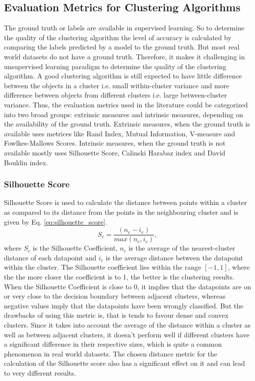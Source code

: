 \subsection{Evaluation Metrics for Clustering Algorithms}
The ground truth or labels are available in supervised learning. So to determine the quality of the clustering algorithm the level of accuracy is calculated by comparing the labels predicted by a model to the ground truth. But most real world datasets do not have a ground truth. Therefore, it makes it challenging in unsupervised learning paradigm to determine the quality of the clustering algorithm. A good clustering algorithm is still expected to have little difference between the objects in a cluster i.e. small within-cluster variance and more difference between objects from different clusters i.e. large between-cluster variance. Thus, the evaluation metrics used in the literature could be categorized into two broad groups: extrinsic measures and intrinsic measures, depending on the availability of the ground truth. Extrinsic measures, when the ground truth is available uses metrices like Rand Index, Mutual Information, V-measure and Fowlkes-Mallows Scores. Intrinsic measures, when the ground truth is not available mostly uses Silhouette Score, Calinski Harabaz index and David Bouldin index.

\subsubsection{Silhouette Score}
Silhouette Score is used to calculate the distance between points within a cluster as compared to its distance from the points in the neighbouring cluster and is given by Eq. \ref{eq:silhouette_score}.
\begin{equation}
  \label{eq:silhouette_score}
  \mathit{S_{c}}= \mathit{\frac{(n_{c}-i_{c})}{max(n_{c},i_{c})}},
\end{equation}
where $S_{c}$ is the Silhouette Coefficient, $n_{c}$ is the average of the nearest-cluster distance of each datapoint and $i_{c}$ is the average distance between the datapoint within the cluster. The Silhouette coefficient lies within the range $[-1,1]$, where the the more closer the coefficient is to 1, the better is the clustering results. When the Silhouette Coefficient is close to 0, it implies that the datapoints are on or very close to the decision boundary between adjacent clusters, whereas negative values imply that the datapoints have been wrongly classified. But the drawbacks of using this metric is, that is tends to favour dense and convex clusters. Since it takes into account the average of the distance within a cluster as well as between adjacent clusters, it doesn't perform well if different clusters have a significant difference in their respective sizes, which is quite a common phenomenon in real world datasets. The chosen distance metric for the calculation of the Silhouette score also has a significant effect on it and can lead to very different results.

